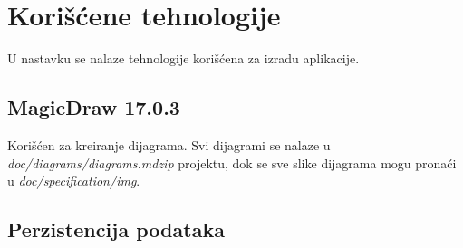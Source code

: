 \section{Korišćene tehnologije}
\par U nastavku se nalaze tehnologije korišćena za izradu aplikacije.
\subsection{MagicDraw 17.0.3}
\par Korišćen za kreiranje dijagrama. Svi dijagrami se nalaze u \textit{doc/diagrams/dia\-grams.mdzip} projektu, dok se sve slike dijagrama mogu pronaći u 
\textit{doc/spe\-cification/img}.
\subsection{Perzistencija podataka}